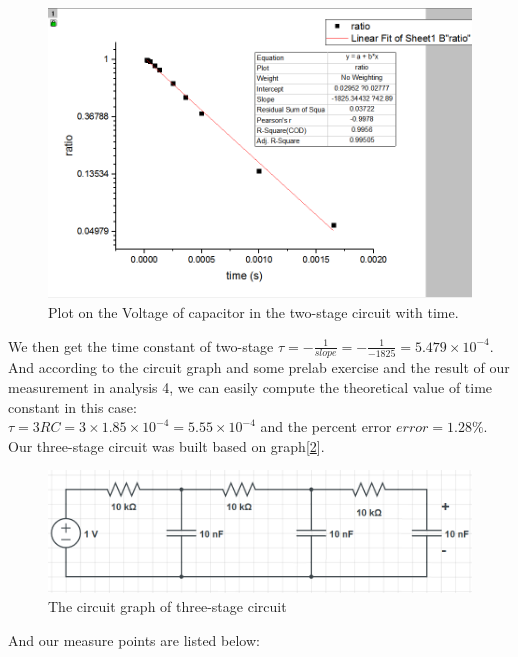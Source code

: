 \begin{figure}[!htbp]
	\centering %
	\includegraphics[width=\linewidth]{images/2_6.PNG} %
	\caption{Plot on the Voltage of capacitor in the two-stage circuit with time.} %
	\label{fig:2.6} %
\end{figure}
\phantom{ } We then get the time constant of two-stage 
$\tau = -\frac{1}{slope} = -\frac{1}{-1825} = 5.479\times10^{-4} $.\\ And according to the circuit graph and some prelab exercise and the result of our measurement in analysis 4, we can easily compute
the theoretical value of time constant in this case:\\
$\tau = 3RC = 3\times1.85\times10^{-4} = 5.55\times10^{-4}$ and the percent error $error = 1.28\%$.\\
\phantom{ } Our three-stage circuit was built based on graph[\ref{fig:2.4}].\\
\begin{figure}[!htbp]
	\centering %
	\includegraphics[width=\linewidth]{images/2_4.PNG} %
	\caption{The circuit graph of three-stage circuit} %
	\label{fig:2.4} %
\end{figure}
\phantom{ } And our measure points are listed below:\\
